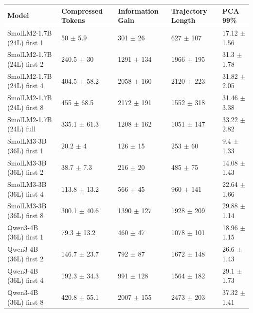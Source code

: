 \begin{tabular}{lllll}
\toprule
 Model                      & Compressed Tokens           & Information Gain         & Trajectory Length        & PCA 99\%                   \\
\midrule
 SmolLM2-1.7B (24L) first 1 & 50 {\small $\pm$ 5.9}       & 301 {\small $\pm$ 26}    & 627 {\small $\pm$ 107}   & 17.12 {\small $\pm$ 1.56} \\
 SmolLM2-1.7B (24L) first 2 & 240.5 {\small $\pm$ 30}     & 1291 {\small $\pm$ 134}  & 1966 {\small $\pm$ 195}  & 31.3 {\small $\pm$ 1.78}  \\
 SmolLM2-1.7B (24L) first 4 & 404.5 {\small $\pm$ 58.2}   & 2058 {\small $\pm$ 160}  & 2120 {\small $\pm$ 223}  & 31.82 {\small $\pm$ 2.05} \\
 SmolLM2-1.7B (24L) first 8 & 455 {\small $\pm$ 68.5}     & 2172 {\small $\pm$ 191}  & 1552 {\small $\pm$ 318}  & 31.46 {\small $\pm$ 3.38} \\
 SmolLM2-1.7B (24L) full    & 335.1 {\small $\pm$ 61.3}   & 1208 {\small $\pm$ 162}  & 1051 {\small $\pm$ 147}  & 33.22 {\small $\pm$ 2.82} \\
 \midrule
 SmolLM3-3B (36L) first 1   & 20.2 {\small $\pm$ 4}       & 126 {\small $\pm$ 15}    & 253 {\small $\pm$ 60}    & 9.4 {\small $\pm$ 1.33}   \\
 SmolLM3-3B (36L) first 2   & 38.7 {\small $\pm$ 7.3}     & 216 {\small $\pm$ 20}    & 485 {\small $\pm$ 75}    & 14.08 {\small $\pm$ 1.43} \\
 SmolLM3-3B (36L) first 4   & 113.8 {\small $\pm$ 13.2}   & 566 {\small $\pm$ 45}    & 960 {\small $\pm$ 141}   & 22.64 {\small $\pm$ 1.66} \\
 SmolLM3-3B (36L) first 8   & 300.1 {\small $\pm$ 40.6}   & 1390 {\small $\pm$ 127}  & 1928 {\small $\pm$ 209}  & 29.88 {\small $\pm$ 1.14} \\
 \midrule
 Qwen3-4B (36L) first 1     & 79.3 {\small $\pm$ 13.2}    & 460 {\small $\pm$ 47}    & 1078 {\small $\pm$ 101}  & 18.96 {\small $\pm$ 1.15} \\
 Qwen3-4B (36L) first 2     & 146.7 {\small $\pm$ 23.7}   & 792 {\small $\pm$ 87}    & 1672 {\small $\pm$ 148}  & 26.6 {\small $\pm$ 1.43}  \\
 Qwen3-4B (36L) first 4     & 192.3 {\small $\pm$ 34.3}   & 991 {\small $\pm$ 128}   & 1564 {\small $\pm$ 182}  & 29.1 {\small $\pm$ 1.73}  \\
 Qwen3-4B (36L) first 8     & 420.8 {\small $\pm$ 55.1}   & 2007 {\small $\pm$ 155}  & 2473 {\small $\pm$ 203}  & 37.32 {\small $\pm$ 1.41} \\

\end{tabular}
